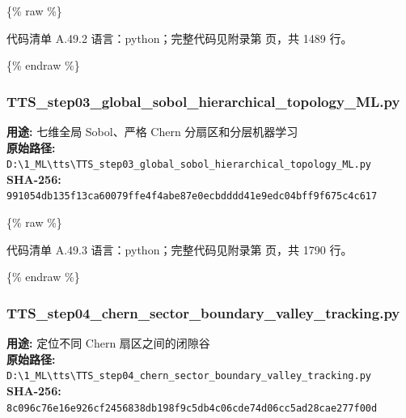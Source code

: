 \documentclass[lang=cn,scheme=chinese,color=blue,device=normal,toc=onecol,math=cm]{elegantbook}
\begin{document}
\{\% raw \%\}\par


\begin{codeindexbox}{代码清单 A.49.2}
语言：python；完整代码见附录第 \pageref{code:49:2} 页，共 1489 行。
\end{codeindexbox}


\{\% endraw \%\}\par


\subsubsection{TTS\_\allowbreak{}step03\_\allowbreak{}global\_\allowbreak{}sobol\_\allowbreak{}hierarchical\_\allowbreak{}topology\_\allowbreak{}ML.py}


\textbf{用途:} 七维全局 Sobol、严格 Chern 分扇区和分层机器学习\\ \textbf{原始路径:} \texttt{D:\textbackslash{}\allowbreak{}1\_\allowbreak{}ML\textbackslash{}\allowbreak{}tts\textbackslash{}\allowbreak{}TTS\_\allowbreak{}step03\_\allowbreak{}global\_\allowbreak{}sobol\_\allowbreak{}hierarchical\_\allowbreak{}topology\_\allowbreak{}ML.py}\\ \textbf{SHA-256:} \texttt{991054db135f13ca60079ffe4f4abe87e0ecbdddd41e9edc04bff9f675c4c617}\par


\{\% raw \%\}\par


\begin{codeindexbox}{代码清单 A.49.3}
语言：python；完整代码见附录第 \pageref{code:49:3} 页，共 1790 行。
\end{codeindexbox}


\{\% endraw \%\}\par


\subsubsection{TTS\_\allowbreak{}step04\_\allowbreak{}chern\_\allowbreak{}sector\_\allowbreak{}boundary\_\allowbreak{}valley\_\allowbreak{}tracking.py}


\textbf{用途:} 定位不同 Chern 扇区之间的闭隙谷\\ \textbf{原始路径:} \texttt{D:\textbackslash{}\allowbreak{}1\_\allowbreak{}ML\textbackslash{}\allowbreak{}tts\textbackslash{}\allowbreak{}TTS\_\allowbreak{}step04\_\allowbreak{}chern\_\allowbreak{}sector\_\allowbreak{}boundary\_\allowbreak{}valley\_\allowbreak{}tracking.py}\\ \textbf{SHA-256:} \texttt{8c096c76e16e926cf2456838db198f9c5db4c06cde74d06cc5ad28cae277f00d}\par
\end{document}
